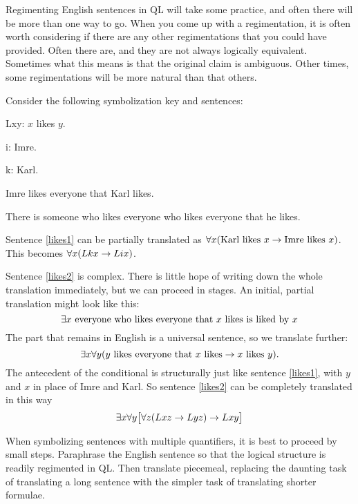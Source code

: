 Regimenting English sentences in QL will take some practice, and often there will be more than one way to go.
When you come up with a regimentation, it is often worth considering if there are any other regimentations that you could have provided.
Often there are, and they are not always logically equivalent.
Sometimes what this means is that the original claim is ambiguous.
Other times, some regimentations will be more natural than that others.


Consider the following symbolization key and sentences:
\begin{ekey}
\item[Lxy:] $x$ likes $y$.
\item[i:] Imre.
\item[k:] Karl.
\end{ekey}
\begin{earg}
\item[\ex{likes1}]Imre likes everyone that Karl likes.
\item[\ex{likes2}]There is someone who likes everyone who likes everyone that he likes.
\end{earg}

Sentence \ref{likes1} can be partially translated as $\forall x(\mbox{Karl likes $x$}\rightarrow\mbox{Imre likes $x$})$.
This becomes $\forall x(Lkx\rightarrow Lix)$.

Sentence \ref{likes2} is complex.
There is little hope of writing down the whole translation immediately, but we can proceed in stages.
An initial, partial translation might look like this: $$\exists x\ \mbox{everyone who likes everyone that $x$ likes is liked by $x$}$$
The part that remains in English is a universal sentence, so we translate further: $$\exists x\forall y(\mbox{$y$ likes everyone that $x$ likes}\rightarrow\mbox{$x$ likes $y$}).$$
The antecedent of the conditional is structurally just like sentence \ref{likes1}, with $y$ and $x$ in place of Imre and Karl.
So sentence \ref{likes2} can be completely translated in this way $$\exists x\forall y\bigl[\forall z(Lxz \rightarrow Lyz) \rightarrow Lxy\bigr]$$

When symbolizing sentences with multiple quantifiers, it is best to proceed by small steps.
Paraphrase the English sentence so that the logical structure is readily regimented in QL.
Then translate piecemeal, replacing the daunting task of translating a long sentence with the simpler task of translating shorter formulae.




